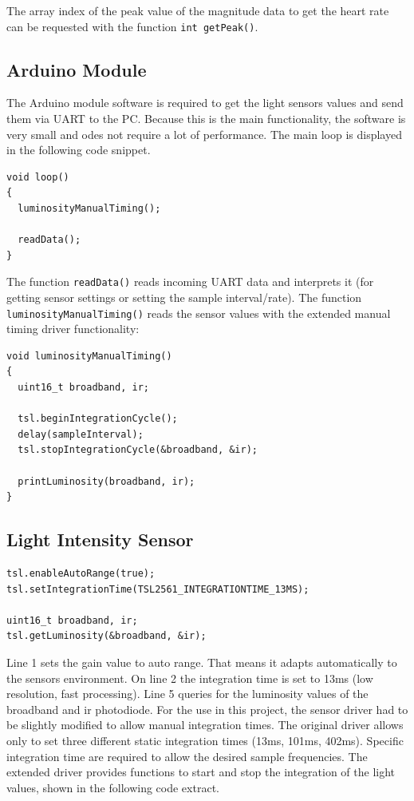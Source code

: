 \documentclass[notitlepage]{scrreprt}
\begin{document}
The array index of the peak value of the magnitude data to get the heart rate can be requested with the function \lstinline{int getPeak()}.

\subsection{Arduino Module}
The Arduino module software is required to get the light sensors values and send them via UART to the PC. Because this is the main functionality, the software is very small and odes not require a lot of performance. The main loop is displayed in the following code snippet.

\begin{lstlisting}
void loop()
{ 
  luminosityManualTiming();
  
  readData();
}
\end{lstlisting}

The function \lstinline{readData()} reads incoming UART data and interprets it (for getting sensor settings or setting the sample interval/rate). The function \lstinline{luminosityManualTiming()} reads the sensor values with the extended manual timing driver functionality:

\begin{lstlisting}
void luminosityManualTiming()
{
  uint16_t broadband, ir;
  
  tsl.beginIntegrationCycle();
  delay(sampleInterval);
  tsl.stopIntegrationCycle(&broadband, &ir);
  
  printLuminosity(broadband, ir);
}
\end{lstlisting}

\subsection{Light Intensity Sensor}
\begin{lstlisting}[caption=Adafruit driver]
tsl.enableAutoRange(true);
tsl.setIntegrationTime(TSL2561_INTEGRATIONTIME_13MS);

uint16_t broadband, ir;
tsl.getLuminosity(&broadband, &ir);
\end{lstlisting}

Line 1 sets the gain value to auto range. That means it adapts automatically to the sensors environment. On line 2 the integration time is set to 13ms (low resolution, fast processing). Line 5 queries for the luminosity values of the broadband and ir photodiode. For the use in this project, the sensor driver had to be slightly modified to allow manual integration times. The original driver allows only to set three different static integration times (13ms, 101ms, 402ms). Specific integration time are required to allow the desired sample frequencies. The extended driver provides functions to start and stop the integration of the light values, shown in the following code extract.
\end{document}
